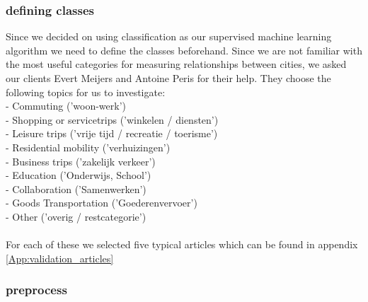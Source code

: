 \subsubsection{defining classes}
Since we decided on using classification as our supervised machine learning algorithm we need to define the classes beforehand. Since we are not familiar with the most useful categories for measuring relationships between cities, we asked our clients Evert Meijers and Antoine Peris for their help. They choose the following topics for us to investigate:\\
- Commuting ('woon-werk') \\
- Shopping or servicetrips ('winkelen / diensten') \\
- Leisure trips ('vrije tijd / recreatie / toerisme') \\
- Residential mobility ('verhuizingen') \\
- Business trips ('zakelijk verkeer') \\
- Education ('Onderwijs, School') \\
- Collaboration ('Samenwerken') \\
- Goods Transportation ('Goederenvervoer') \\
- Other ('overig / restcategorie') \\
\\
For each of these we selected five typical articles which can be found in appendix \ref{App:validation_articles}

\subsubsection{preprocess}

